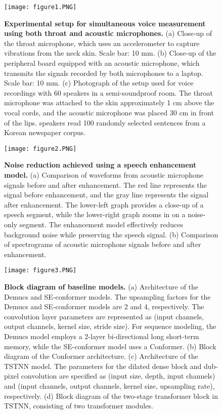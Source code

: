 \documentclass[10pt]{wlscirep}
\begin{document}
\begin{figure}[ht]
\centering
\texttt{[image: figure1.PNG]}
\caption{\textbf{Experimental setup for simultaneous voice measurement using both throat and acoustic microphones.} (a) Close-up of the throat microphone, which uses an accelerometer to capture vibrations from the neck skin. Scale bar: 10 mm. (b) Close-up of the peripheral board equipped with an acoustic microphone, which transmits the signals recorded by both microphones to a laptop. Scale bar: 10 mm. (c) Photograph of the setup used for voice recordings with 60 speakers in a semi-soundproof room. The throat microphone was attached to the skin approximately 1 cm above the vocal cords, and the acoustic microphone was placed 30 cm in front of the lips. speakers read 100 randomly selected sentences from a Korean newspaper corpus\cite{NIKL2023}.
}
\label{fig:1}
\end{figure}

\begin{figure}[ht]
\centering
\texttt{[image: figure2.PNG]}
\caption{\textbf{Noise reduction achieved using a speech enhancement model\cite{defossez2020real}.} (a) Comparison of waveforms from acoustic microphone signals before and after enhancement. The red line represents the signal before enhancement, and the gray line represents the signal after enhancement. The lower-left graph provides a close-up of a speech segment, while the lower-right graph zooms in on a noise-only segment. The enhancement model effectively reduces background noise while preserving the speech signal. (b) Comparison of spectrograms of acoustic microphone signals before and after enhancement.
}
\label{fig:2}
\end{figure}

\begin{figure}[ht]
\centering
\texttt{[image: figure3.PNG]}

\caption{\textbf{Block diagram of baseline models.} (a) Architecture of the Demucs and SE-conformer models. The upsampling factors for the Demucs and SE-conformer models are 2 and 4, respectively. The convolution layer parameters are represented as (input channels, output channels, kernel size, stride size). For sequence modeling, the Demucs model employs a 2-layer bi-directional long short-term memory, while the SE-conformer model uses a Conformer. (b) Block diagram of the Conformer architecture. (c) Architecture of the TSTNN model. The parameters for the dilated dense block and dub-pixel convolution are specified as (input size, depth, input channels) and (input channels, output channels, kernel size, upsampling rate), respectively. (d) Block diagram of the two-stage transformer block in TSTNN, consisting of two transformer modules.
}
\label{fig:3}
\end{figure}
\end{document}
